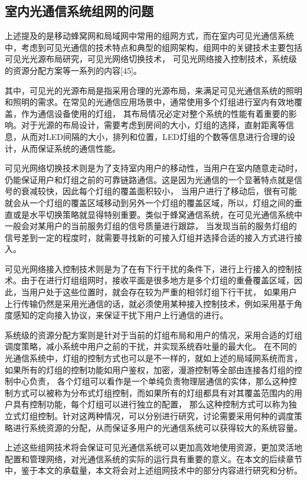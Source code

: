 \subsection{室内光通信系统组网的问题}
上述提及的是移动蜂窝网和局域网中常用的组网方式，而在室内可见光通信系统中，考虑到可见光通信的技术特点和典型的组网架构，组网中的关键技术主要包括可见光光源布局研究，可见光网络切换技术，
可见光网络接入控制技术，系统级的资源分配方案等一系列的内容[45]。

其中，可见光的光源布局是指采用合理的光源布局，来满足可见光通信系统的照明和照明的需求。在常见的光通信应用场景中，通常使用多个灯组进行室内有效地覆盖，作为通信设备使用的灯组，
其布局情况必定对整个系统的性能有着重要的影响。对于光源的布局设计，需要考虑到房间的大小，灯组的选择，直射距离等信息，从而对LED间隔的大小，排列和位置，LED灯组的个数等信息进行合理的设计，从而保证系统的通信性能。

可见光网络切换技术则是为了支持室内用户的移动性，当用户在室内随意走动时，仍能保证用户和灯组之前的可靠链路通信。这是因为光通信的一个显著特点就是信号的衰减较快，因此每个灯组的覆盖面积较小，
当用户进行了移动后，很有可能就会从一个灯组的覆盖区域移动到另外一个灯组的覆盖区域，所以，灯组之间的垂直或是水平切换策略就显得特别重要。类似于蜂窝通信系统，在可见光通信系统中一般会对某用户的当前服务灯组的信号质量进行跟踪，
当发现当前的服务灯组的信号差到一定的程度时，就需要寻找新的可接入灯组并选择合适的接入方式进行接入。

可见光网络接入控制技术则是为了在有下行干扰的条件下，进行上行接入的控制技术。由于在进行灯组组网时，接收平面是很多地方是多个灯组的重叠覆盖区域，因此，当用户处于这些位置时，就会存在较为严重的相邻灯组下行干扰，
如果用户上行传输仍然是采用光通信的话，就必须使用某种接入控制技术，例如采用基于角度感知的定向接入协议，来保证干扰下用户上行通信的进行。

系统级的资源分配方案则是针对于当前的灯组布局和用户的情况，采用合适的灯组调度策略，减小系统中用户之前的干扰，并实现系统吞吐量的最大化。
在不同的光通信系统中，灯组的控制方式也可以是不一样的，就如上述的局域网系统而言，如果所有的灯组的控制功能如用户鉴权，加密，漫游控制等全部由连接各灯组的控制中心负责，
各个灯组可以看作是一个单纯负责物理层通信的实体，那么这种控制方式可以被称为分布式灯组控制，而如果所有的灯组都具有对其覆盖范围内的用户具有控制功能，每个灯组可以进行独立的配置，
那么这种控制方式可以称为独立式灯组控制。针对这两种情况，可以分别进行研究，讨论需要采用何种的调度策略进行系统资源的分配，从而保证多用户的光通信系统可以获得较大的系统容量。

上述这些组网技术将会保证可见光通信系统可以更加高效地使用资源，更加灵活地配置和管理网络，对光通信系统的实际的运行具有重要的意义。在本文的后续章节中，鉴于本文的承载量，本文将会对上述组网技术中的部分内容进行研究和分析。

